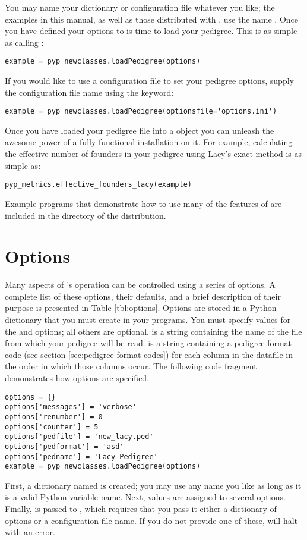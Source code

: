 You may name your dictionary or configuration file whatever you like; the examples in this manual, as well as those distributed with \PyPedal{}, use the name .  Once you have defined your options to is time to load your pedigree.  This is as simple as calling :
\begin{verbatim}
example = pyp_newclasses.loadPedigree(options)
\end{verbatim}
If you would like to use a configuration file to set your pedigree options, supply the configuration file name using the  keyword:
\begin{verbatim}
example = pyp_newclasses.loadPedigree(optionsfile='options.ini')
\end{verbatim}
Once you have loaded your pedigree file into a  object you can unleash the awesome power of a fully-functional \PyPedal{} installation on it.  For example, calculating the effective number of founders in your pedigree using Lacy's \citeyear{ref640} exact method is as simple as:
\begin{verbatim}
pyp_metrics.effective_founders_lacy(example)
\end{verbatim}
Example programs that demonstrate how to use many of the features of \PyPedal{} are included in the  directory of the distribution.
\section{Options}
\label{sec:pypedal-options}
Many aspects of \PyPedal{}'s operation can be controlled using a series of options.  A complete list of these options, their defaults, and a brief description of their purpose is presented in Table \ref{tbl:options}.  Options are stored in a Python dictionary that you must create in your programs.  You must specify values for the  and  options; all others are optional.   is a string containing the name of the file from which your pedigree will be read.   is a string containing a pedigree format code (see section \ref{sec:pedigree-format-codes}) for each column in the datafile in the order in which those columns occur.  The following code fragment demonstrates how options are specified.
\begin{verbatim}
options = {}
options['messages'] = 'verbose'
options['renumber'] = 0
options['counter'] = 5
options['pedfile'] = 'new_lacy.ped'
options['pedformat'] = 'asd'
options['pedname'] = 'Lacy Pedigree'
example = pyp_newclasses.loadPedigree(options)
\end{verbatim}
First, a dictionary named  is created; you may use any name you like as long as it is a valid Python variable name.  Next, values are assigned to several options.  Finally,  is passed to , which requires that you pass it either a dictionary of options or a configuration file name.  If you do not provide one of these, \PyPedal{} will halt with an error.

